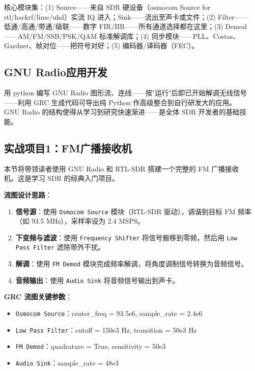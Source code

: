 \documentclass[12pt,UTF8]{ctexbook}
\begin{document}
核心模块集：(1) Source——来自 SDR 硬设备（osmocom Source for rtl/hackrf/lime/uhd）实流 IQ 进入；Sink——流出至声卡或文件；(2) Filter——低通/高通/带通/级联——数字 FIR/IIR——所有通道选择都在这里；(3) Demod——AM/FM/SSB/PSK/QAM 标准解调库；(4) 同步模块——PLL、Costas、Gardner、帧对位——把符号对好；(5) 编码器/译码器（FEC）。

\subsection{GNU Radio应用开发}

用 python 编写 GNU Radio 图形流、连线——按"运行"后即已开始解调无线信号——利用 GRC 生成代码可导出纯 Python 作高级整合到自行研发大的应用。GNU Radio 的结构使得从学习到研究快速渐进——是全体 SDR 开发者的基础技能。

\subsection{实战项目1：FM广播接收机}
\label{subsec:fm_receiver}

本节将带领读者使用 GNU Radio 和 RTL-SDR 搭建一个完整的 FM 广播接收机。这是学习 SDR 的经典入门项目。

\textbf{流图设计思路}：
\begin{enumerate}[leftmargin=2cm]
    \item \textbf{信号源}：使用 \texttt{Osmocom Source} 模块（RTL-SDR 驱动），调谐到目标 FM 频率（如 93.5 MHz），采样率设为 2.4 MSPS。
    \item \textbf{下变频与滤波}：使用 \texttt{Frequency Shifter} 将信号搬移到零频，然后用 \texttt{Low Pass Filter} 滤除带外干扰。
    \item \textbf{解调}：使用 \texttt{FM Demod} 模块完成频率解调，将角度调制信号转换为音频信号。
    \item \textbf{音频输出}：使用 \texttt{Audio Sink} 将音频信号输出到声卡。
\end{enumerate}

\textbf{GRC 流图关键参数}：
\begin{itemize}[leftmargin=2cm]
    \item \texttt{Osmocom Source}：center\_freq = 93.5e6, sample\_rate = 2.4e6
    \item \texttt{Low Pass Filter}：cutoff = 150e3 Hz, transition = 50e3 Hz
    \item \texttt{FM Demod}：quadrature = True, sensitivity = 50e3
    \item \texttt{Audio Sink}：sample\_rate = 48e3
\end{itemize}
\end{document}
